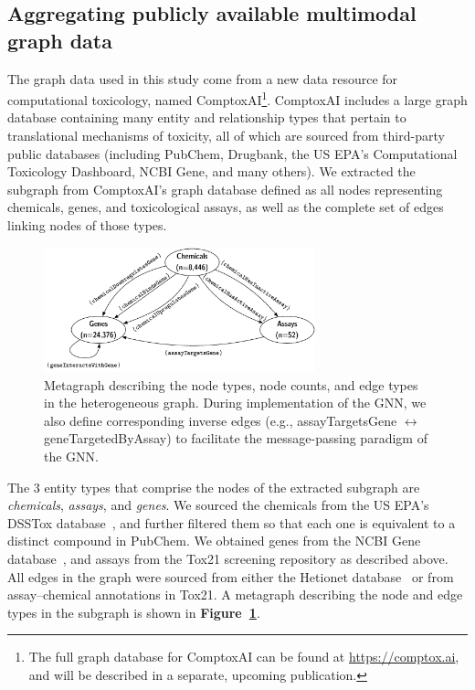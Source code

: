 \documentclass{ws-procs11x85}
\begin{document}
\subsection{Aggregating publicly available multimodal graph data}
The graph data used in this study come from a new data resource for computational toxicology, named ComptoxAI\footnote{The full graph database for ComptoxAI can be found at \url{https://comptox.ai}, and will be described in a separate, upcoming publication.}.
ComptoxAI includes a large graph database containing many entity and relationship types that pertain to translational mechanisms of toxicity, all of which are sourced from third-party public databases (including PubChem, Drugbank, the US EPA's Computational Toxicology Dashboard, NCBI Gene, and many others).
We extracted the subgraph from ComptoxAI's graph database defined as all nodes representing chemicals, genes, and toxicological assays, as well as the complete set of edges linking nodes of those types.

\begin{figure}
   \centering
   \includegraphics[width=0.7\textwidth]{figures/figure1-1.pdf}
   \caption{Metagraph describing the node types, node counts, and edge types in the heterogeneous graph. During implementation of the GNN, we also define corresponding inverse edges (e.g., assayTargetsGene $\leftrightarrow$ geneTargetedByAssay) to facilitate the message-passing paradigm of the GNN.}\label{fig:2}
\end{figure}

The 3 entity types that comprise the nodes of the extracted subgraph are \textit{chemicals}, \textit{assays}, and \textit{genes}.
We sourced the chemicals from the US EPA's DSSTox database~\cite{williams2017comptox}, and further filtered them so that each one is equivalent to a distinct compound in PubChem.
We obtained genes from the NCBI Gene database~\cite{brown2015gene}, and assays from the Tox21 screening repository as described above.
All edges in the graph were sourced from either the Hetionet database~\cite{himmelstein2017systematic} or from assay--chemical annotations in Tox21.
A metagraph describing the node and edge types in the subgraph is shown in \textbf{Figure~\ref{fig:2}}.
\end{document}
